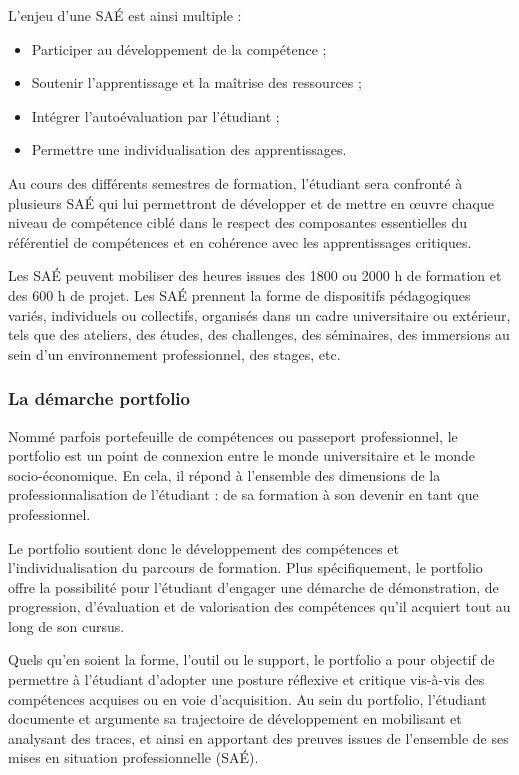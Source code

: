 \documentclass[10pt]{article}
\begin{document}
L’enjeu d’une SAÉ est ainsi multiple :
\begin{itemize}
\item Participer au développement de la compétence ;
\item Soutenir l’apprentissage et la maîtrise des ressources ;
\item Intégrer l’autoévaluation par l’étudiant ;
\item Permettre une individualisation des apprentissages.
\end{itemize}

Au cours des différents semestres de formation, l’étudiant sera
confronté à plusieurs SAÉ qui lui permettront de développer et de mettre
en œuvre chaque niveau de compétence ciblé dans le respect des
composantes essentielles du référentiel de compétences et en cohérence
avec les apprentissages critiques.

Les SAÉ peuvent mobiliser des heures issues des 1800 ou 2000 h de
formation et des 600 h de projet. Les SAÉ prennent la forme de
dispositifs pédagogiques variés, individuels ou collectifs, organisés
dans un cadre universitaire ou extérieur, tels que des ateliers, des
études, des challenges, des séminaires, des immersions au sein d’un
environnement professionnel, des stages, etc.

\subsubsection*{La démarche portfolio}%
\label{FICHE-\VAR{portfolio.getId()|le}}%

Nommé parfois portefeuille de compétences ou passeport professionnel, le
portfolio est un point de connexion entre le monde universitaire et le
monde socio-économique. En cela, il répond à l’ensemble des dimensions
de la professionnalisation de l’étudiant : de sa formation à son devenir
en tant que professionnel.

Le portfolio soutient donc le développement des compétences et
l’individualisation du parcours de formation.  Plus spécifiquement, le
portfolio offre la possibilité pour l’étudiant d’engager une démarche de
démonstration, de progression, d’évaluation et de valorisation des
compétences qu’il acquiert tout au long de son cursus.

Quels qu’en soient la forme, l’outil ou le support, le portfolio a pour
objectif de permettre à l’étudiant d’adopter une posture réflexive et
critique vis-à-vis des compétences acquises ou en voie d’acquisition. Au
sein du portfolio, l’étudiant documente et argumente sa trajectoire de
développement en mobilisant et analysant des traces, et ainsi en
apportant des preuves issues de l’ensemble de ses mises en situation
professionnelle (SAÉ).
\end{document}
